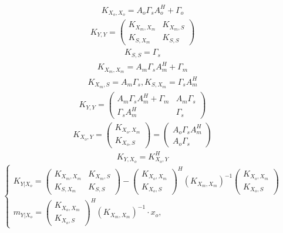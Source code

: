 \documentclass[11pt]{article}
\begin{document}
\begin{gather}
K_{X_o,X_o}=A_o\Gamma_sA_o^H+\Gamma_o
\end{gather}
\begin{gather}
K_{Y,Y} = \begin{pmatrix}
K_{X_m, X_m}&K_{X_m, S}\\
K_{S, X_m}&K_{S, S}
\end{pmatrix}
\end{gather}
\begin{gather}
K_{S,S} = \Gamma_s
\end{gather}
\begin{gather}
K_{X_m,X_m} = A_m \Gamma_s A_m^H + \Gamma_m
\end{gather}
\begin{gather}
K_{X_m,S} = A_m \Gamma_s, K_{S, X_m} = \Gamma_s A_m^H 
\end{gather}
\begin{gather}
K_{Y,Y} = \begin{pmatrix}
A_m \Gamma_s A_m^H + \Gamma_m&A_m \Gamma_s\\
\Gamma_s A_m^H&\Gamma_s
\end{pmatrix}
\end{gather}
\begin{gather}
K_{X_o,Y}
= \begin{pmatrix}
K_{X_o,X_m}\\
K_{X_o,S}
\end{pmatrix}= 
\begin{pmatrix}
A_o\Gamma_s A_m^H\\
A_o\Gamma_s
\end{pmatrix}
\end{gather}
\begin{gather}
K_{Y,X_o}
= K_{X_o,Y}^H
\end{gather}
\begin{equation}
\left\{ \begin{gathered} 
K_{Y|X_o} = \begin{pmatrix}
K_{X_m, X_m}&K_{X_m, S}\\
K_{S, X_m}&K_{S, S}
\end{pmatrix}-\begin{pmatrix}
K_{X_o,X_m}\\
K_{X_o,S}
\end{pmatrix}^H(K_{X_m,X_m})^{-1}\begin{pmatrix}
K_{X_o,X_m}\\
K_{X_o,S}
\end{pmatrix} \\
m_{Y|X_o} =   \begin{pmatrix}
K_{X_o,X_m}\\
K_{X_o,S}
\end{pmatrix}^H(K_{X_m,X_m})^{-1}\cdot x_o,
\end{gathered} \right.
\end{equation}
\end{document}
